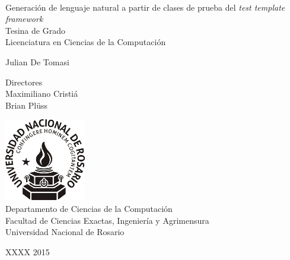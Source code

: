 \documentclass[spanish,11pt,a4paper]{memoir} %
\begin{document}
 

%
%
\thispagestyle{empty}

{%
\sffamily
\centering
\Large

~\vspace{\fill}

{\huge 
Generación de lenguaje natural a partir de clases de prueba del \textit{test template framework}
}\\[0.6em]
Tesina de Grado\\
Licenciatura en Ciencias de la Computación

\vspace{1.5cm}

{\LARGE
Julian De Tomasi
}

\vspace{1.5cm}

{\tiny Directores}\\
Maximiliano Cristiá\\
Brian Plüss\\

\vspace{2.5cm}

\includegraphics[scale=0.8]{img/unr.png}\\
Departamento de Ciencias de la Computación\\
Facultad de Ciencias Exactas, Ingeniería y Agrimensura\\
Universidad Nacional de Rosario

\vspace{\fill}

XXXX 2015

}%

\cleardoublepage


\tableofcontents*













\appendix





\end{document}
